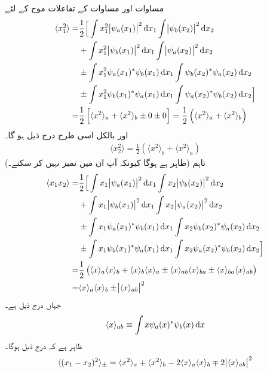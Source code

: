  مساوات  اور مساوات  کے تفاعلات موج کے لئے 
\begin{gather*}
	\begin{aligned}
		\langle x_1^2 \rangle =& \frac{1}{2}\Big[\int x_1^2\abs{\psi_a(x_1)}^2\dif x_1\int\abs{\psi_b(x_2)}^2\dif x_2 \\
		&+ \int x_1^2\abs{\psi_b(x_1)}^2\dif x_1\int\abs{\psi_a(x_2)}^2\dif x_2 \\
		&\pm\int x_1^2\psi_a(x_1)^*\psi_b(x_1)\dif x_1\int\psi_b(x_2)^*\psi_a(x_2)\dif x_2 \\
		&\pm\int x_1^2\psi_b(x_1)^*\psi_a(x_1)\dif x_1\int\psi_a(x_2)^*\psi_b(x_2)\dif x_2\Big] \\
		=& \frac{1}{2}\left[\langle x^2 \rangle_a+\langle x^2 \rangle_b\pm0\pm0\right]=\frac{1}{2}\left(\langle x^2 \rangle_a+\langle x^2\rangle_b\right)
	\end{aligned}
\end{gather*}
اور بالکل اسی طرح درج ذیل ہو گا۔
\begin{align*}
	\langle x_2^2 \rangle=\frac{1}{2}\left(\langle x^2 \rangle_b+\langle x^2 \rangle_a\right)
\end{align*}
(ظاہر ہے  ہوگا کیونکہ آپ ان میں تمیز نہیں کر سکتے۔) تاہم
\begin{gather*}
	\begin{aligned}
		\langle x_1x_2 \rangle=&\frac{1}{2}\Big[\int x_1\abs{\psi_a(x_1)}^2\dif x_1\int x_2\abs{\psi_b(x_2)}^2\dif x_2 \\
		&+\int x_1\abs{\psi_b(x_1)}^2\dif x_1\int x_2\abs{\psi_a(x_2)}^2\dif x_2 \\
		&\pm\int x_1\psi_a(x_1)^*\psi_b(x_1)\dif x_1\int x_2\psi_b(x_2)^*\psi_a(x_2)\dif x_2 \\
		&\pm\int x_1\psi_b(x_1)^*\psi_a(x_1)\dif x_1\int x_2\psi_a(x_2)^*\psi_b(x_2)\dif x_2\Big] \\
		=& \frac{1}{2}\left(\langle x \rangle_a\langle x \rangle_b+\langle x \rangle_b\langle x \rangle_a\pm\langle x \rangle_{ab}\langle x \rangle_{ba}\pm\langle x \rangle_{ba}\langle x \rangle_{ab}\right)\\
		=&\langle x \rangle_a\langle x \rangle_b\pm\abs{\langle x \rangle_{ab}}^2
	\end{aligned}
\end{gather*}
 جہاں درج ذیل ہے۔
\begin{align}\label{مساوات_متماثل_کے_بیچ}
	\langle x \rangle_{ab}\equiv\int x\psi_a(x)^*\psi_b(x)\dif x
\end{align}
ظاہر ہے کہ درج ذیل ہوگا۔
\begin{align}\label{مساوات_متماثل_فاصلہ_متماثل}
	\langle(x_1-x_2)^2\rangle_{\pm}=\langle x^2\rangle_a+\langle x^2 \rangle_b-2\langle x \rangle_a\langle x \rangle_b\mp2\abs{\langle x \rangle_{ab}}^2
\end{align}

